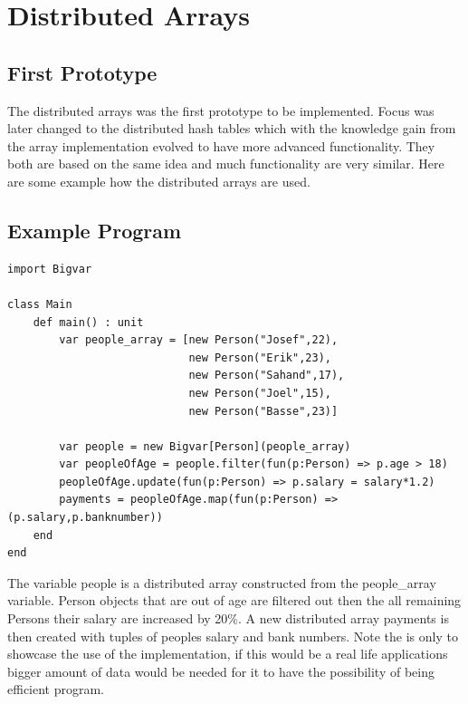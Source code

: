 \section{Distributed Arrays}
\subsection{First Prototype}
The distributed arrays was the first prototype to be implemented. Focus was later changed to the distributed hash tables which with the knowledge gain from the array implementation evolved to have more advanced functionality. They both are based on the same idea and much functionality are very similar. Here are some example how the distributed arrays are used. \subsection{Example Program}

\begin{lstlisting}
import Bigvar

class Main
    def main() : unit
        var people_array = [new Person("Josef",22),
                            new Person("Erik",23),
                            new Person("Sahand",17),
                            new Person("Joel",15),
                            new Person("Basse",23)]

        var people = new Bigvar[Person](people_array)
        var peopleOfAge = people.filter(fun(p:Person) => p.age > 18)
        peopleOfAge.update(fun(p:Person) => p.salary = salary*1.2)
        payments = peopleOfAge.map(fun(p:Person) => (p.salary,p.banknumber))        
    end
end
\end{lstlisting}

The variable people is a distributed array constructed from the people\_array variable. Person objects that are out of age are filtered out then the all remaining Persons their salary are increased by 20\%. A new distributed array payments is then created with tuples of peoples salary and bank numbers. Note the is only to showcase the use of the implementation, if this would be a real life applications bigger amount of data would be needed for it to have the possibility of being efficient program. 
